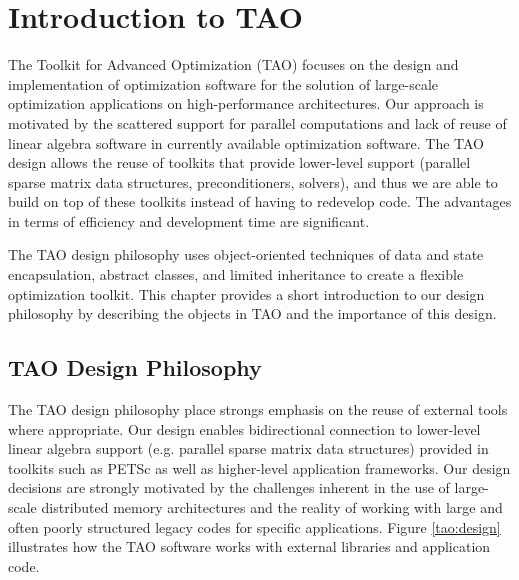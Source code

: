 \chapter{Introduction to TAO}
\label{chapter:introduction}


The Toolkit for Advanced Optimization (TAO) focuses on the design and
implementation of optimization software for the
solution of large-scale optimization applications on high-performance
architectures.  Our approach is motivated by the scattered support for
parallel computations and lack of reuse of linear algebra software in
currently available optimization software.  The TAO design allows the
reuse of toolkits that provide lower-level support (parallel sparse
matrix data structures, preconditioners, solvers), and thus we are
able to build on top of these toolkits instead of having to redevelop
code. The advantages in terms of efficiency and development time are
significant.

The TAO design philosophy uses object-oriented techniques of data and
state encapsulation, abstract classes, and limited inheritance to
create a flexible optimization toolkit.  This chapter provides a short
introduction to our design philosophy by describing the objects in TAO
and the importance of this design. 

\begin{comment}   
 Since a major concern in the TAO
project is the performance and scalability of optimization algorithms
on large problems, we also present some performance resuls.


\end{comment}

\section{TAO Design Philosophy} 


The TAO design philosophy place strongs emphasis on the reuse of
external tools where appropriate.  Our design enables bidirectional
connection to lower-level linear algebra support (e.g. parallel sparse
matrix data structures) provided in toolkits such as PETSc
\cite{petsc} \cite{petsc-user-ref,petsc-web-page}
as well as higher-level application
frameworks.  Our design decisions are strongly motivated by the
challenges inherent in the use of large-scale distributed memory
architectures and the reality of working with large and often poorly
structured legacy codes for specific applications.  Figure
\ref{tao:design} illustrates how the TAO software works with external
libraries and application code.

